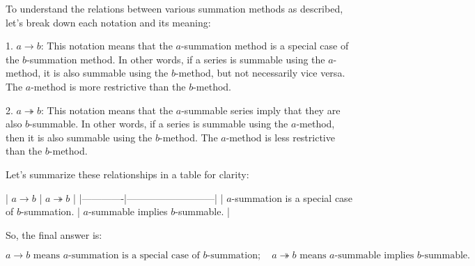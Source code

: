 To understand the relations between various summation methods as described, let's break down each notation and its meaning:

1. \(a \to b\): This notation means that the \(a\)-summation method is a special case of the \(b\)-summation method. In other words, if a series is summable using the \(a\)-method, it is also summable using the \(b\)-method, but not necessarily vice versa. The \(a\)-method is more restrictive than the \(b\)-method.

2. \(a \twoheadrightarrow b\): This notation means that the \(a\)-summable series imply that they are also \(b\)-summable. In other words, if a series is summable using the \(a\)-method, then it is also summable using the \(b\)-method. The \(a\)-method is less restrictive than the \(b\)-method.

Let's summarize these relationships in a table for clarity:

| \(a \to b\) | \(a \twoheadrightarrow b\) |
|-------------|---------------------------|
| \(a\)-summation is a special case of \(b\)-summation. | \(a\)-summable implies \(b\)-summable. |

So, the final answer is:

\[
\boxed{a \to b \text{ means } a\text{-summation is a special case of } b\text{-summation}; \quad a \twoheadrightarrow b \text{ means } a\text{-summable implies } b\text{-summable.}}
\]